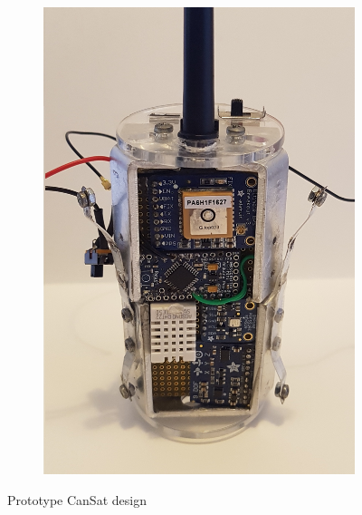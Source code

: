 \documentclass[]{report}
\begin{document}
\begin{figure}
\begin{subfigure}{.5\textwidth}
		\includegraphics[width=0.8\linewidth, angle=0]{old_cansat.jpg}
	\end{subfigure}
	\caption{Prototype CanSat design}
	\label{oldcansat}
\end{figure}
\end{document}
